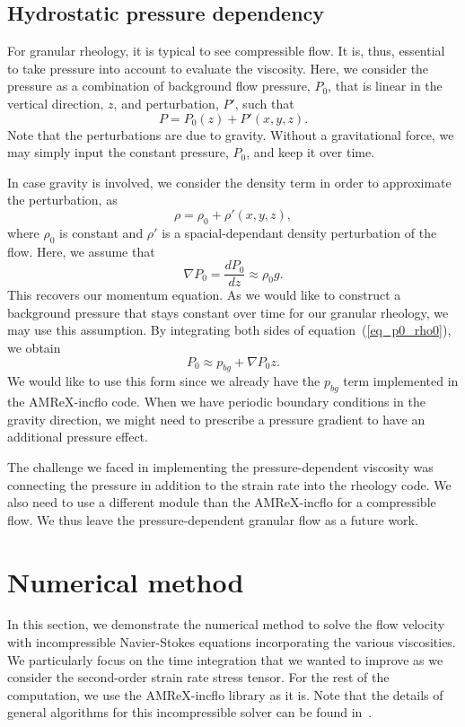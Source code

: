 \subsection{Hydrostatic pressure dependency}
For granular rheology, it is typical to see compressible flow. It is, thus, essential to take pressure into account to evaluate the viscosity.
Here, we consider the pressure as a combination of background flow pressure, $P_0$, that is linear in the vertical direction, $z$, and perturbation, $P'$, such that
\[
P = P_0(z) + P'(x,y,z).\]
Note that the perturbations are due to gravity. Without a gravitational force, we may simply input the constant pressure, $P_0$, and keep it over time.
\par
In case gravity is involved, we consider the density term in order to approximate the perturbation, as 
\[
\rho  = \rho_0  + \rho'(x,y,z), 
\]
where $\rho_0$ is constant and $\rho'$ is a spacial-dependant density perturbation of the flow. 
Here, we assume that 
\begin{equation}
    \nabla P_0  = \frac{d P_0}{d z} \approx \rho_0  g.  
\label{eq_p0_rho0}
\end{equation}
This recovers our momentum equation. As we would like to construct a background pressure that stays constant over time for our granular rheology, we may use this assumption.
By integrating both sides of equation~(\ref{eq_p0_rho0}), we obtain
\begin{equation}
    P_0 \approx p_{bg} + \nabla P_0 z.
\end{equation}
We would like to use this form since we already have the $p_{bg}$ term implemented in the AMReX-incflo code.
%
When we have periodic boundary conditions in the gravity direction, we might need to prescribe a pressure gradient to have an additional pressure effect. 
\par
The challenge we faced in implementing the pressure-dependent viscosity was connecting the pressure in addition to the strain rate into the rheology code. 
We also need to use a different module than the AMReX-incflo for a compressible flow.
We thus leave the pressure-dependent granular flow as a future work.

\section{Numerical method}
In this section, we demonstrate the numerical method to solve the flow velocity with incompressible Navier-Stokes equations incorporating the various viscosities. We particularly focus on the time integration that we wanted to improve as we consider the second-order strain rate stress tensor.
For the rest of the computation, we use the AMReX-incflo library as it is. Note that the details of general algorithms for this incompressible solver can be found in~\cite{almgren_conservative_1998}.
